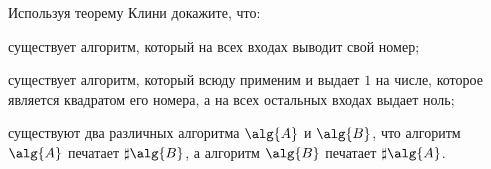 Используя теорему Клини докажите, что:
\begin{enumcyr}
    \item существует алгоритм, который на всех входах выводит свой номер;
    \item существует алгоритм, который всюду применим и выдает $1$ на числе, которое является квадратом
        его номера, а на всех остальных входах выдает ноль;
    \item существуют два различных алгоритма $\alg{A}$ и $\alg{B}$, что алгоритм $\alg{A}$ печатает
        $\sharp \alg{B}$, а алгоритм $\alg{B}$ печатает $\sharp \alg{A}$.
\end{enumcyr}